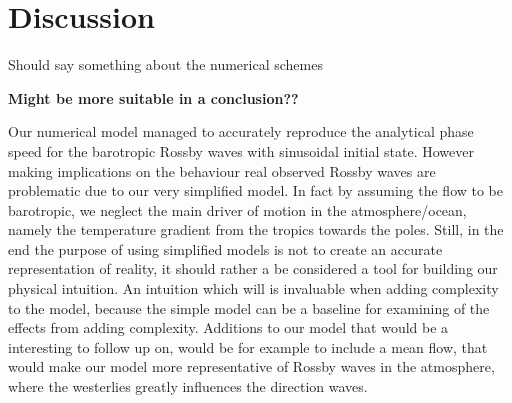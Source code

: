 \section{Discussion}
Should say something about the numerical schemes 

\textbf{Might be more suitable in a conclusion??}

Our numerical model managed to accurately reproduce the analytical phase speed
for the barotropic Rossby waves with sinusoidal initial state. However making
implications on the behaviour real 
observed Rossby waves are problematic due to our very simplified model. In fact
by assuming the flow to be barotropic, we neglect the main driver of
motion in the atmosphere/ocean, namely the temperature gradient from the tropics
towards the poles. Still, in the end the purpose of using simplified models is
not to create an accurate representation of reality, it should rather a be
considered a tool for building our physical intuition. An intuition which will
is invaluable when adding complexity to the model, because the simple model can
be a baseline for examining of the effects from adding complexity.
Additions to our model that would be a interesting to follow up on, would be for
example to include a mean flow, that would make our model more representative of
Rossby waves in the atmosphere, where the westerlies greatly influences the
direction waves.  